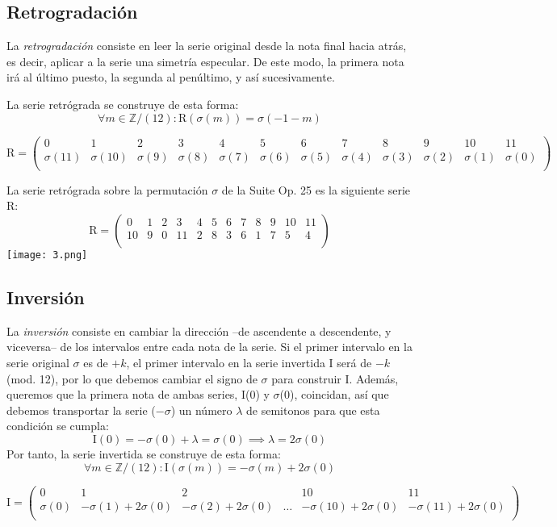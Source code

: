 	\subsection{Retrogradación}
		La \emph{retrogradación} consiste en leer la serie original desde la nota final hacia atrás, es decir, aplicar a la serie una simetría especular. De este modo, la primera nota irá al último puesto, la segunda al penúltimo, y así sucesivamente.
		
		La serie retrógrada se construye de esta forma:
		$$
		\forall m\in \mathbb{Z} / (12):	\text{R}\left(\sigma\left(m\right)\right)=\sigma\left(-1-m\right)$$ \begin{footnotesize}$$			\text{R}=\left(\begin{matrix}0&1&2&3&4&5&6&7&8&9&10&11\\	\sigma(11)&\sigma(10)&\sigma(9)&\sigma(8)&\sigma(7)&\sigma(6)&\sigma(5)&\sigma(4)&\sigma(3)&\sigma(2)&\sigma(1)&\sigma(0)\\\end{matrix}\right)
			$$\end{footnotesize}
			
		La serie retrógrada sobre la permutación $\sigma$ de la Suite Op. 25 es la siguiente serie R:	
		$$\text{R}=\left(\begin{matrix}0&1&2&3&4&5&6&7&8&9&10&11\\10&9&0&11&2&8&3&6&1&7&5&4\\\end{matrix}\right)$$		
		\texttt{[image: 3.png]}
		
	\subsection{Inversión}
		La \emph{inversión} consiste en cambiar la dirección --de ascendente a descendente, y viceversa-- de los intervalos entre cada nota de la serie. Si el primer intervalo en la serie original $\sigma$ es de $+k$, el primer intervalo en la serie invertida I será de $-k$ (mod. 12), por lo que debemos cambiar el signo de $\sigma$ para construir I. Además, queremos que la primera nota de ambas series, I(0) y $\sigma$(0), coincidan, así que debemos transportar la serie ($-\sigma$) un número $\lambda$ de semitonos para que esta condición se cumpla:
		$$\text{I}(0)=-\sigma\left(0\right)+\lambda=\sigma\left(0\right)\implies \lambda=2\sigma(0)$$
		Por tanto, la serie invertida se construye de esta forma:
		$$
		\forall m\in \mathbb{Z} / (12):	\text{I}\left(\sigma\left(m\right)\right)=-\sigma\left(m\right)+2\sigma\left(0\right)
		$$
		\begin{footnotesize}	$$
		\text{I}=\left(\begin{matrix}0&1&2&&10&11\\\sigma(0)&-\sigma(1)+2\sigma(0)&-\sigma(2)+2\sigma(0)&\ldots&-\sigma(10)+2\sigma(0)&-\sigma(11)+2\sigma(0)\\\end{matrix}\right)
		$$	\end{footnotesize}
		
